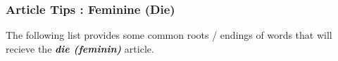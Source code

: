 \documentclass[a4paper,twocolumn,10pt]{article}
\newcommand{\subsubsectionend}
{
\nolinenumbers
\linenumbers
}
\begin{document}

\subsubsectionend

\subsubsection{Article Tips : Feminine (Die)}
\label{sssec:article_tips_feminine_die_}

The following list provides some common roots / endings of words that will
recieve the \textbf{\textit{die (feminin)}} article.


\nolinenumbers

\vspace{0.2cm}
\end{document}
